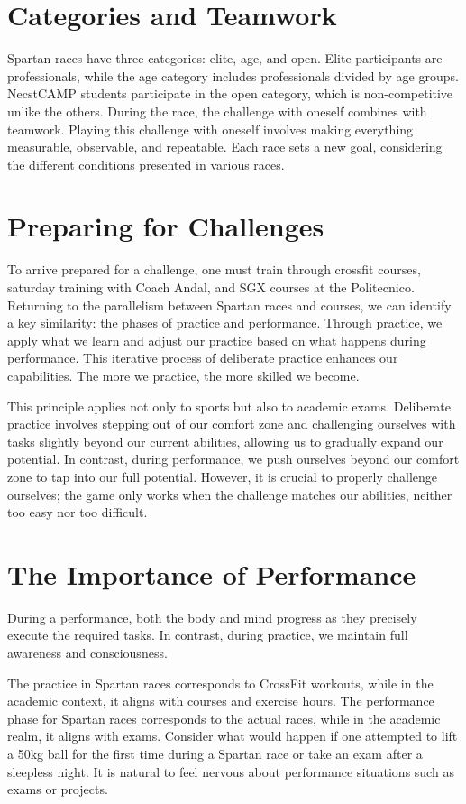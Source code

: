 \documentclass[12pt,oneside,a4paper]{article}
\begin{document}
\section{Categories and Teamwork} \label{sec:cat}
Spartan races have three categories: elite, age, and open. Elite participants are professionals, while the age category includes professionals divided by age groups. NecstCAMP students participate in the open category, which is non-competitive unlike the others. During the race, the challenge with oneself combines with teamwork. Playing this challenge with oneself involves making everything measurable, observable, and repeatable. Each race sets a new goal, considering the different conditions presented in various races.

\section{Preparing for Challenges} \label{sec:prep}
To arrive prepared for a challenge, one must train through crossfit courses, saturday training with Coach Andal, and SGX courses at the Politecnico. Returning to the parallelism between Spartan races and courses, we can identify a key similarity: the phases of practice and performance. Through practice, we apply what we learn and adjust our practice based on what happens during performance. This iterative process of deliberate practice enhances our capabilities. The more we practice, the more skilled we become. 

This principle applies not only to sports but also to academic exams. Deliberate practice involves stepping out of our comfort zone and challenging ourselves with tasks slightly beyond our current abilities, allowing us to gradually expand our potential. In contrast, during performance, we push ourselves beyond our comfort zone to tap into our full potential. However, it is crucial to properly challenge ourselves; the game only works when the challenge matches our abilities, neither too easy nor too difficult.

\section{The Importance of Performance} \label{sec:imp}
During a performance, both the body and mind progress as they precisely execute the required tasks. In contrast, during practice, we maintain full awareness and consciousness. 

The practice in Spartan races corresponds to CrossFit workouts, while in the academic context, it aligns with courses and exercise hours. The performance phase for Spartan races corresponds to the actual races, while in the academic realm, it aligns with exams. Consider what would happen if one attempted to lift a 50kg ball for the first time during a Spartan race or take an exam after a sleepless night. It is natural to feel nervous about performance situations such as exams or projects.
\end{document}
